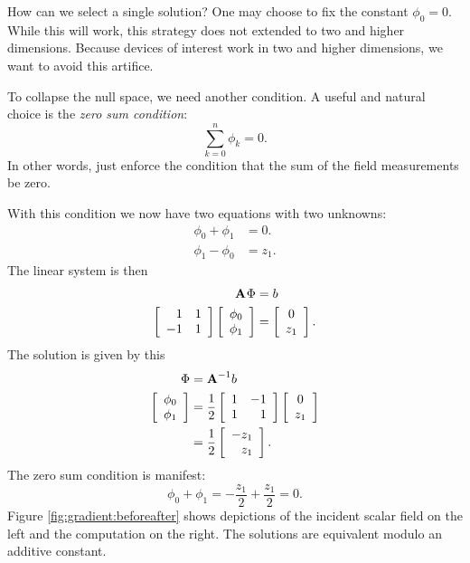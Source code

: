 How can we select a single solution? One may choose to fix the constant $\phi_{0} = 0.$ While this will work, this strategy does not extended to two and higher dimensions. Because devices of interest work in two and higher dimensions, we want to avoid this artifice.

To collapse the null space, we need another condition. A useful and natural choice is the \textit{zero sum condition}:
\begin{equation}
  \sum_{k=0}^{n}\phi_{k} = 0.
\end{equation}
In other words, just enforce the condition that the sum of the field measurements be zero.

With this condition we now have two equations with two unknowns:
\begin{equation}
  \begin{split}
    \phi_{0} + \phi_{1} &= 0.\\
    \phi_{1} - \phi_{0} &= z_{1}.
  \end{split}
\end{equation}
The linear system is then
\begin{equation}
  \begin{split}
    \A{} \Phi &= b\\
    \mat{rr}{1&1\\-1&1}\mat{c}{\phi_{0}\\\phi_{1}}&=\mat{c}{0\\z_{1}}.
  \end{split}
\end{equation}
The solution is given by this
\begin{equation}
  \begin{split}
    \Phi&=\A{-1}b\\
     \mat{c}{\phi_{0}\\\phi_{1}}&=\frac{1}{2}\mat{rr}{1&-1\\1&1}\mat{c}{0\\z_{1}}\\
     &=\frac{1}{2}\mat{r}{-z_{1}\\z_{1}}.
  \end{split}
  \label{eq:gradient:onecell:regular}
\end{equation}
The zero sum condition is manifest:
\begin{equation}
  \phi_{0}+\phi_{1}=-\frac{z_{1}}{2}+\frac{z_{1}}{2} = 0.
\end{equation}
Figure \eqref{fig:gradient:beforeafter} shows depictions of the incident scalar field on the left and the computation on the right. The solutions are equivalent modulo an additive constant.
